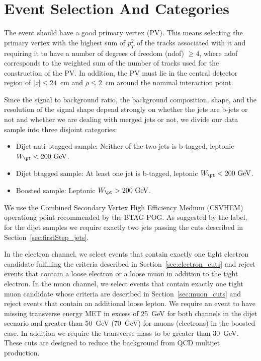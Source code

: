 \section{Event Selection And Categories}
\label{sec:evtSelCat}
The event should have a good primary vertex (PV). This means selecting
the primary vertex with the highest sum of $p_{T}^2$ of the tracks
associated with it and requiring it to have a number of degrees of
freedom (ndof) $\ge 4$, where ndof corresponds to the weighted sum of
the number of tracks used for the construction of the PV. In addition,
the PV must lie in the central detector region of $|z| \le 24$~cm
and $\rho \le 2$~cm around the nominal interaction point.

\par
Since the signal to background ratio, the background 
composition, shape, and the resolution of the signal shape 
depend strongly on whether the jets are b-jets or not and whether we are dealing with merged jets or not,
we divide our data sample into three disjoint categories:
\begin{itemize}
\item 
Dijet anti-btagged sample:
Neither of the two jets is b-tagged, leptonic $W_{\pt}<200~\mathrm{GeV}$.
\item 
Dijet btagged sample:
At least one jet is b-tagged, leptonic $W_{\pt}<200~\mathrm{GeV}$.
\item 
Boosted sample:
Leptonic $W_{\pt}>200~\mathrm{GeV}$.
\end{itemize}
We use the Combined Secondary Vertex High Efficiency Medium (CSVHEM) operationg point 
recommended by the BTAG POG. As suggested by the label, for the dijet samples we require exactly two jets passing the cuts
described in Section~\ref{sec:firstStep_jets}.

\par
In the electron channel, we select events that contain exactly one
tight electron candidate fulfilling the criteria described in
Section~\ref{sec:electron_cuts} and reject events that contain a
loose electron or a loose muon in addition to the tight electron. 
In the muon channel, we select events that contain exactly one
tight muon candidate whose criteria are described in
Section~\ref{sec:muon_cuts} and reject events that contain an
additional loose lepton.
We require an event to have missing transverse energy
MET in excess of 25~GeV for both channels in the dijet scenario and greater than
50~GeV (70~GeV) for muons (electrons) in the boosted case. In addition we require
the transverse mass to be greater than
30~GeV.  These cuts are designed to reduce the background
from QCD multijet production.


